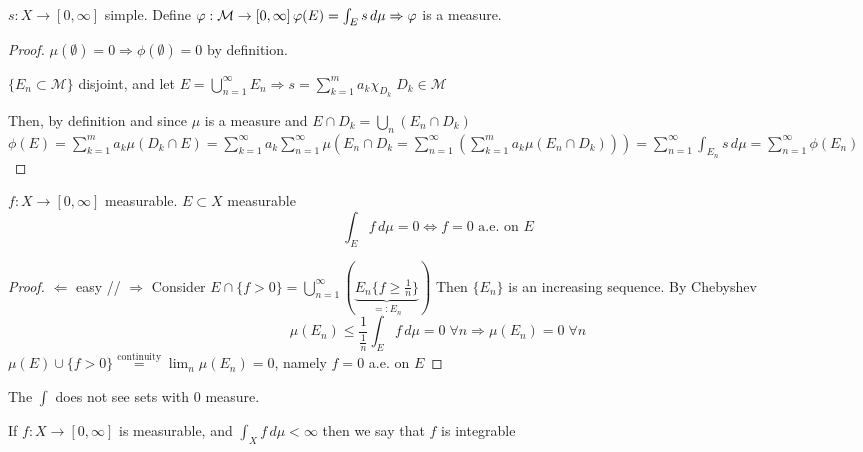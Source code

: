 \begin{theorem}
    \(s : X \to \left[0, \infty\right]\) simple. Define \(\phi : \mathcal{M} \to \left[0, \infty\right] \\ \phi(E) = \int_E s \, d\mu \\ \Rightarrow \phi \) is a measure. 
\end{theorem}

\begin{proof}
    \(\mu(\emptyset) =0 \Rightarrow \phi(\emptyset)=0 \) by definition. 
    \begin{definition}
        \(\{E_n \subset \mathcal{M}\}\) disjoint, and let \(E = \bigcup_{n=1}^\infty E_n \Rightarrow s = \sum_{k=1}^m a_k \chi_{D_k} \; D_k \in \mathcal{M}
        \)
    \end{definition}
    Then, by definition and since \(\mu\) is a measure and \(E \cap D_k = \bigcup_n (E_n \cap D_k)  \) \\
    \(\phi(E) = \sum_{k=1}^m a_k \mu(D_k \cap E) = \sum_{k=1}^\infty a_k \sum_{n=1}^\infty \mu(E_n \cap D_k = \sum_{n=1}^\infty \left( \sum_{k=1}^m a_k \mu (E_n \cap D_k) \right)) = \sum_{n=1}^\infty \int_{E_n} s \, d\mu = \sum_{n=1}^\infty \phi(E_n)\) 
\end{proof}

\begin{theorem}
    \(f: X \to \left[0, \infty\right]\) measurable. \(E \subset X \) measurable 
    \[\int_E f \, d\mu =0 \iff f=0 \text{ a.e. on } E \]
\end{theorem}
\begin{proof}
    \( \Leftarrow \) easy //
    \( \Rightarrow \) Consider \( E \cap \{f >0\} = \bigcup_{n=1}^\infty \left(\underbrace{E_n \{f \geq \frac{1}{n}\}}_{=:E_n}\right) \)
    Then \(\{E_n\}\) is an increasing sequence. By Chebyshev \[\mu (E_n) \leq \frac{1}{\frac{1}{n}} \int_E f \, d\mu =0 \; \forall n \Rightarrow \mu(E_n)=0 \; \forall n \]
    \(\mu(E) \cup \{f>0\} \overset{\text{continuity}}{=} \lim_n \mu (E_n)=0\), namely \(f=0\) a.e. on \(E\)
\end{proof}

The \(\int\) does not see sets with 0 measure.

\begin{definition}
    If \( f:X \to \left[0, \infty\right] \) is measurable, and \( \int_X f \, d\mu < \infty \) then we say that \(f\) is integrable
\end{definition}

